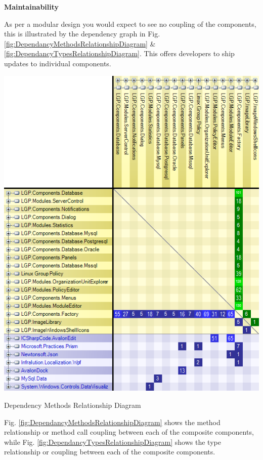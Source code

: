 	\large{\bfseries{Maintainability}}
	\vspace{2mm}

	\normalsize
	{
		As per a modular design you would expect to see no coupling of the components, this is illustrated by the dependency graph in
		Fig. \ref{fig:DependancyMethodsRelationshipDiagram} \& \ref{fig:DependancyTypesRelationshipDiagram}.  
		This offers developers to ship updates to individual components.  
		\newline	
		\newline
		
		\begin{figurehere}
			\centering
			\includegraphics[scale=0.85]{pages/chapter4/figures/dependancyMatrixMethods.png}
			\caption{Dependency Methods Relationship Diagram}
			\label{fig:DependancyMethodsRelationshipDiagram}
		\end{figurehere}
		
		\vspace{5mm}
		Fig. \ref{fig:DependancyMethodsRelationshipDiagram} shows the method relationship or method call coupling between each 
		of the composite components, while Fig. \ref{fig:DependancyTypesRelationshipDiagram} shows the type relationship or 
		coupling between each of the composite components.  
		\newline
		\newline
		
}
